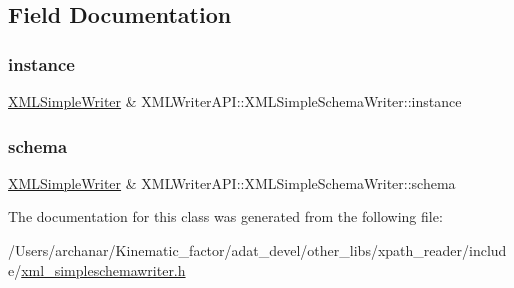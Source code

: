 \subsection{Field Documentation}
\mbox{\label{classXMLWriterAPI_1_1XMLSimpleSchemaWriter_acad25faff4c5f64554d85a075e232b19}} 
\subsubsection{\texorpdfstring{instance}{instance}}
{\footnotesize\ttfamily \mbox{\hyperlink{classXMLWriterAPI_1_1XMLSimpleWriter}{X\+M\+L\+Simple\+Writer}} \& X\+M\+L\+Writer\+A\+P\+I\+::\+X\+M\+L\+Simple\+Schema\+Writer\+::instance\hspace{0.3cm}{\ttfamily [protected]}}

\mbox{\label{classXMLWriterAPI_1_1XMLSimpleSchemaWriter_a97a86e85c4750599a68ab4a318c2d11d}} 
\subsubsection{\texorpdfstring{schema}{schema}}
{\footnotesize\ttfamily \mbox{\hyperlink{classXMLWriterAPI_1_1XMLSimpleWriter}{X\+M\+L\+Simple\+Writer}} \& X\+M\+L\+Writer\+A\+P\+I\+::\+X\+M\+L\+Simple\+Schema\+Writer\+::schema\hspace{0.3cm}{\ttfamily [protected]}}



The documentation for this class was generated from the following file\+:\begin{DoxyCompactItemize}
\item 
/\+Users/archanar/\+Kinematic\+\_\+factor/adat\+\_\+devel/other\+\_\+libs/xpath\+\_\+reader/include/\mbox{\hyperlink{other__libs_2xpath__reader_2include_2xml__simpleschemawriter_8h}{xml\+\_\+simpleschemawriter.\+h}}\end{DoxyCompactItemize}
